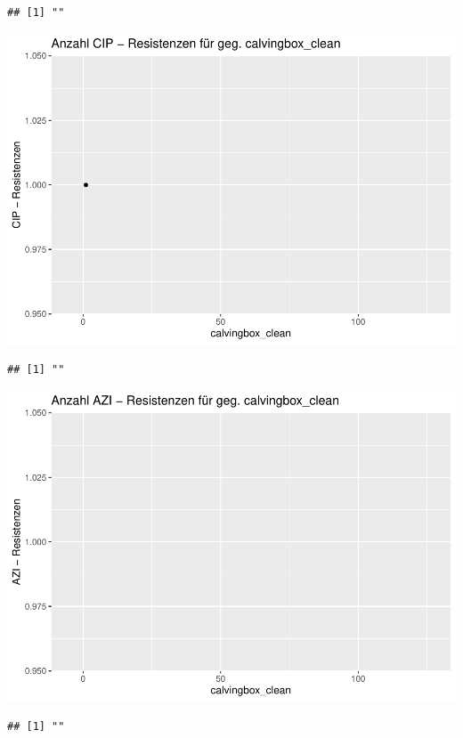\documentclass[
]{article}
\begin{document}
\begin{verbatim}
## [1] ""
\end{verbatim}

\includegraphics{NResistenzen_files/figure-latex/unnamed-chunk-6-22.pdf}

\begin{verbatim}
## [1] ""
\end{verbatim}

\includegraphics{NResistenzen_files/figure-latex/unnamed-chunk-6-23.pdf}

\begin{verbatim}
## [1] ""
\end{verbatim}
\end{document}
